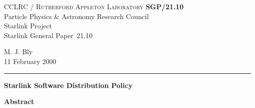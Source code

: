 \documentclass[twoside,11pt]{article}
\newcommand{\stardoccategory}  {Starlink General Paper}
\newcommand{\stardocinitials}  {SGP}
\newcommand{\stardocnumber}    {21.10}
\newcommand{\stardocauthors}   {M. J. Bly}
\newcommand{\stardocdate}      {11 February 2000}
\newcommand{\stardoctitle}     {Starlink Software Distribution Policy}
\newcommand{\stardocname}{\stardocinitials /\stardocnumber}
\newenvironment{latexonly}{}{}
\renewcommand{\_}{\texttt{\symbol{95}}}
\begin{document}
\thispagestyle{empty}

\begin{latexonly}
   CCLRC / \textsc{Rutherford Appleton Laboratory} \hfill \textbf{\stardocname}\\
   {\large Particle Physics \& Astronomy Research Council}\\
   {\large Starlink Project\\}
   {\large \stardoccategory\ \stardocnumber}
   \begin{flushright}
   \stardocauthors\\
   \stardocdate
   \end{flushright}
   \vspace{-4mm}
   \rule{\textwidth}{0.5mm}
   \vspace{5mm}
   \begin{center}
   {\Large\textbf{\stardoctitle}}
   \end{center}
   \vspace{5mm}

   \vspace{10mm}
   \begin{center}
      {\Large\textbf{Abstract}}
   \end{center}
\end{latexonly}
\end{document}
